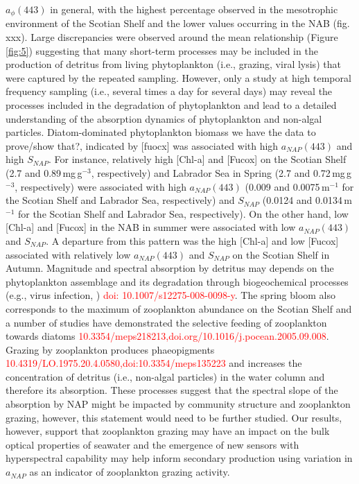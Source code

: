\documentclass[utf8]{frontiersSCNS} %
\begin{document}
$a_\phi(443)$ in general, with the highest percentage observed in the mesotrophic environment of the Scotian Shelf and the lower values occurring in the NAB (fig. xxx). Large discrepancies were observed around the mean relationship (Figure \ref{fig:5}) suggesting that many short-term processes may be included in the production of detritus from living phytoplankton (i.e., grazing, viral lysis) that were captured by the repeated sampling. However, only a study at high temporal frequency sampling (i.e., several times a day for several days) may reveal the processes included in the degradation of phytoplankton and lead to a detailed understanding of the absorption dynamics of phytoplankton and non-algal particles. Diatom-dominated phytoplankton biomass we have the data to prove/show that?, indicated by [fuocx] was associated with high $a_{NAP}(443)$ and high $S_{NAP}$. For instance, relatively high [Chl-a] and [Fucox] on the Scotian Shelf (2.7 and 0.89\,mg\,g$^{-3}$, respectively) and Labrador Sea in Spring (2.7 and 0.72\,mg\,g$^{-3}$, respectively) were associated with high $a_{NAP}(443)$ (0.009 and 0.0075\,m$^{-1}$ for the Scotian Shelf and Labrador Sea, respectively) and $S_{NAP}$ (0.0124 and 0.0134\,m$^{-1}$ for the Scotian Shelf and Labrador Sea, respectively). On the other hand, low [Chl-a] and [Fucox] in the NAB in summer were associated with low $a_{NAP}(443)$ and $S_{NAP}$. A departure from this pattern was the high [Chl-a] and low [Fucox] associated with relatively low $a_{NAP}(443)$ and $S_{NAP}$  on the Scotian Shelf in Autumn. Magnitude and spectral absorption by detritus may depends on the phytoplankton assemblage and its degradation through biogeochemical processes (e.g., virus infection, \citealt{nagasaki2008}) \textcolor{red}{doi: 10.1007/s12275-008-0098-y}. The spring bloom also corresponds to the maximum of zooplankton abundance on the Scotian Shelf \citep{casault2020} and a number of studies have demonstrated the selective feeding of zooplankton towards diatoms \citep{teegarden2001,leising2005}\textcolor{red}{10.3354/meps218213,doi.org/10.1016/j.pocean.2005.09.008}.  Grazing by zooplankton produces phaeopigments \citep{shuman1975,head1993} \textcolor{red}{10.4319/LO.1975.20.4.0580,doi:10.3354/meps135223} and increases the concentration of detritus (i.e., non-algal particles) in the water column and therefore its absorption. These processes suggest that the spectral slope of the absorption by NAP might be impacted by community structure and zooplankton grazing, however, this statement would need to be further studied. Our results, however, support that zooplankton grazing may have an impact on the bulk optical properties of seawater and the emergence of new sensors with hyperspectral capability may help inform secondary production using variation in $a_{NAP}$ as an indicator of zooplankton grazing activity. 
\end{document}
